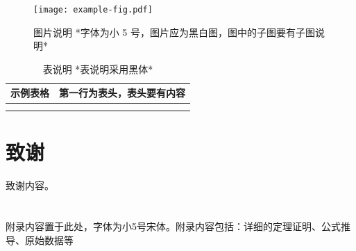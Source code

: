 \documentclass{cjc}
\begin{document}
\begin{figure}[htb]
  \centering
  \texttt{[image: example-fig.pdf]}
  \caption{图片说明 *字体为小 5 号，图片应为黑白图，图中的子图要有子图说明*}
\end{figure}

\begin{table}[htb]
  \centering
  \caption{表说明 *表说明采用黑体*}
  \small
  \begin{tabular}{cc}
    \toprule
    示例表格 & 第一行为表头，表头要有内容 \\
    \midrule
             &                            \\
    \midrule
             &                            \\
    \bottomrule
  \end{tabular}
\end{table}





\section*{致谢}

致谢内容。


\nocite{*}






\appendix

\section{}

附录内容置于此处，字体为小5号宋体。附录内容包括：详细的定理证明、公式推导、原始数据等










\end{document}
